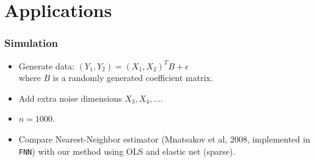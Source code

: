 \documentclass{beamer}
\newcommand{\bX}{\boldsymbol{X}}
\newcommand{\bY}{\boldsymbol{Y}}
\begin{document}




\section{Applications}

\begin{frame}
\sectionpage
\end{frame}

\begin{frame}
\frametitle{Simulation}

\begin{itemize}
\item Generate data: $(Y_1, Y_2) = (X_1, X_2)^T B + \epsilon$\\ where $B$ is a randomly generated coefficient matrix.
\item Add extra noise dimensions $X_3, X_4, \hdots$.
\item $n = 1000$.
\item Compare Nearest-Neighbor estimator (Mnatsakov et al, 2008, implemented in {\tt FNN}) with our method using OLS and elastic net (sparse).
\end{itemize}

\end{frame}
\end{document}

